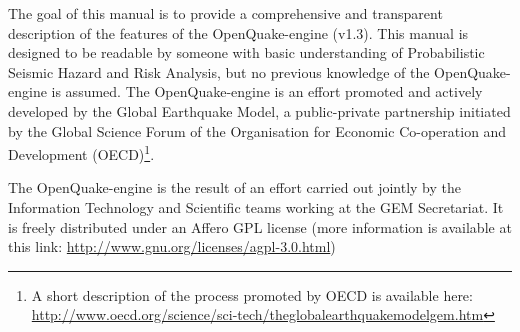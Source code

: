 The goal of this manual is to provide a comprehensive and transparent description
of the features of the OpenQuake-engine (v1.3). This manual is designed to be 
readable by someone with basic understanding of Probabilistic Seismic Hazard 
and Risk Analysis, but no previous knowledge of the OpenQuake-engine is assumed.
%
The OpenQuake-engine is an effort promoted and actively developed by the
Global Earthquake Model, a public-private partnership initiated by the Global
Science Forum of the Organisation for Economic Co-operation and Development 
(OECD)\footnote{A short description of the process promoted by OECD is available 
here: \href{http://www.oecd.org/science/sci-tech/theglobalearthquakemodelgem.htm}
{http://www.oecd.org/science/sci-tech/theglobalearthquakemodelgem.htm}}.

The OpenQuake-engine is the result of an effort carried out jointly by the
Information Technology and Scientific teams working at the GEM Secretariat. 
It is freely distributed under an Affero GPL license 
(more information is available at this link: 
\href{http://www.gnu.org/licenses/agpl-3.0.html}
{http://www.gnu.org/licenses/agpl-3.0.html})
